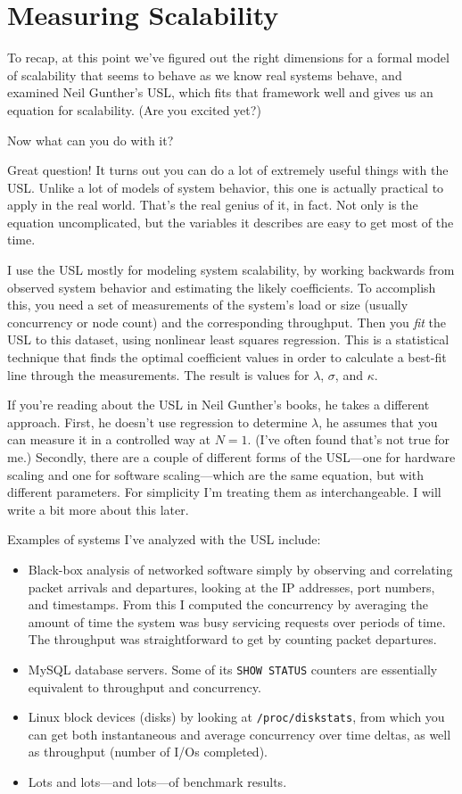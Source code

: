 \documentclass{vivid_layout}
\begin{document}
\newpage
\section{Measuring Scalability}

To recap, at this point we've figured out the right dimensions for a formal
model of scalability that seems to behave as we know real systems behave, and
examined Neil Gunther's USL, which fits that framework well and gives us an
equation for scalability. (Are you excited yet?)

Now what can you do with it?

Great question! It turns out you can do a lot of extremely useful things with
the USL.  Unlike a lot of models of system behavior, this one is actually
practical to apply in the real world. That's the real genius of it, in fact. Not
only is the equation uncomplicated, but the variables it describes are easy to
get most of the time.

I use the USL mostly for modeling system scalability, by working backwards from
observed system behavior and estimating the likely coefficients. To accomplish
this, you need a set of measurements of the system's load or size (usually
concurrency or node count) and the corresponding throughput. Then you {\itshape
fit} the USL to this dataset, using nonlinear least squares regression. This is
a statistical technique that finds the optimal coefficient values in order to
calculate a best-fit line through the measurements. The result is values for
$\lambda$, $\sigma$, and $\kappa$.

If you're reading about the USL in Neil Gunther's books, he takes a different
approach. First, he doesn't use regression to determine $\lambda$, he assumes
that you can measure it in a controlled way at $N=1$. (I've often found that's
not true for me.) Secondly, there are a couple of different forms of the
USL---one for hardware scaling and one for software scaling---which are the same
equation, but with different parameters. For simplicity I'm treating them as
interchangeable. I will write a bit more about this later.

Examples of systems I've analyzed with the USL include:

\begin{itemize}
\item Black-box analysis of networked software simply by observing and
correlating packet arrivals and departures, looking at the IP addresses, port
numbers, and timestamps. From this I computed the concurrency by averaging the
amount of time the system was busy servicing requests over periods of time. The
throughput was straightforward to get by counting packet departures.
\item MySQL database servers. Some of its \texttt{SHOW STATUS} counters are
essentially equivalent to throughput and concurrency.
\item Linux block devices (disks) by looking at \texttt{/proc/diskstats}, from
which you can get both instantaneous and average concurrency over time deltas,
as well as throughput (number of I/Os completed).
\item Lots and lots---and lots---of benchmark results.
\end{itemize}
\end{document}
